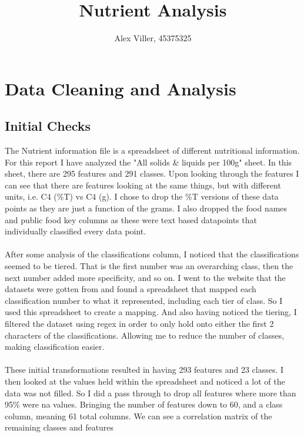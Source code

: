 \documentclass[12pt,a4paper]{article}
\title{Nutrient Analysis}
\author{Alex Viller, 45375325}
\date{}
\begin{document}
    \maketitle

    \tableofcontents{}

    \clearpage
    \section{Data Cleaning and Analysis}
    \subsection{Initial Checks}
    The Nutrient information file is a spreadsheet of different nutritional
    information. For this report I have analyzed the "All solids \& liquids per
    100g" sheet. In this sheet, there are 295 features and 291 classes. Upon
    looking through the features I can see that there are features looking at
    the same things, but with different units, i.e. C4 (\%T) vs C4 (g). I chose to
    drop the \%T versions of these data points as they are just a function of
    the grams. I also dropped the food names and public food key columns as these
    were text based datapoints that individually classified every data point.
    \\
    \\
    After some analysis of the classifications column, I noticed that the
    classifications seemed to be tiered. That is the first number was an overarching
    class, then the next number added more specificity, and so on. I went to the
    website that the datasets were gotten from and found a spreadsheet that mapped
    each classification number to what it represented, including each tier of class.
    So I used this spreadsheet to create a mapping. And also having noticed the tiering,
    I filtered the dataset using regex in order to only hold onto either the first 2
    characters of the classifications. Allowing me to reduce the number of classes,
    making classification easier.
    \\
    \\
    These initial transformations resulted in having 293 features and 23 classes. I then
    looked at the values held within the spreadsheet and noticed a lot of the data was
    not filled. So I did a pass through to drop all features where more than 95\% were
    na values. Bringing the number of features down to 60, and a class column, meaning
    61 total columns. We can see a correlation matrix of the remaining classes and features
\end{document}
